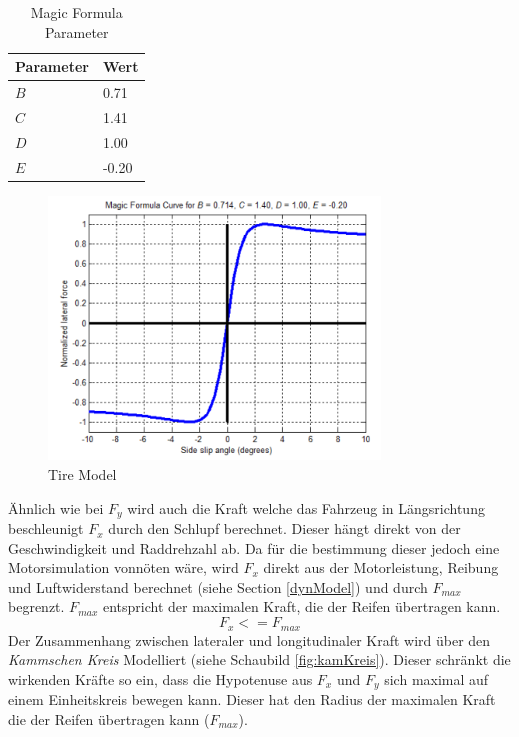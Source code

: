 \documentclass{like}
\begin{document}
\begin{table}[]
	\centering
	\begin{tabular}{l|l}
		\hline
		Parameter	& Wert \\ \hline
		\(B\)	&  0.71 \\
		\(C\)	&  1.41 \\
		\(D\)	&  1.00 \\
		\(E\)	& -0.20 \\

	\end{tabular}
	\caption{Magic Formula Parameter}
	\label{tireParam}
\end{table}

\begin{figure}[ht!]
	\centering
	\includegraphics[width=250pt]{Abbildungen/pacejka.png}
	\caption{Tire Model}
	\label{fig:pacejka}
\end{figure}

Ähnlich wie bei \(F_y\) wird auch die Kraft welche das Fahrzeug in Längsrichtung beschleunigt \(F_x\) durch den Schlupf berechnet. Dieser hängt direkt von der Geschwindigkeit und Raddrehzahl ab. 
Da für die bestimmung dieser jedoch eine Motorsimulation vonnöten wäre, wird \(F_x\) direkt aus der Motorleistung, Reibung und Luftwiderstand berechnet (siehe Section \ref{dynModel}) und durch \(F_{max}\) begrenzt. \(F_{max}\) entspricht der maximalen Kraft, die der Reifen übertragen kann.\\
\begin{equation}
F_x <= F_{max}
\end{equation}
Der Zusammenhang zwischen lateraler und longitudinaler Kraft wird über den \textit{Kammschen Kreis} Modelliert (siehe Schaubild \ref{fig:kamKreis}). Dieser schränkt die wirkenden Kräfte so ein, dass die Hypotenuse aus \(F_x\) und \(F_y\) sich maximal auf einem Einheitskreis bewegen kann. Dieser hat den Radius der maximalen Kraft die der Reifen übertragen kann (\(F_{max}\)).
\end{document}
